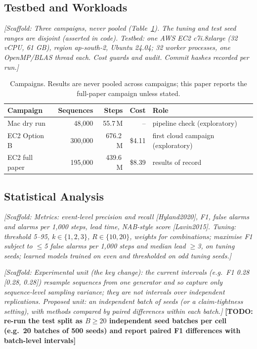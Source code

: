 \documentclass[conference]{IEEEtran}
\newcommand{\scaffold}[1]{\textcolor{blue!60!black}{\textit{[Scaffold: #1]}}}
\newcommand{\todo}[1]{\textcolor{red!70!black}{\textbf{[TODO: #1]}}}
\begin{document}
\subsection{Testbed and Workloads}\label{sec:testbed}
\scaffold{Three campaigns, never pooled (Table~\ref{tab:campaigns}). The tuning and test seed ranges are disjoint (asserted in code). Testbed: one AWS EC2 c7i.8xlarge (32 vCPU, 61 GB), region ap-south-2, Ubuntu 24.04; 32 worker processes, one OpenMP/BLAS thread each. Cost guards and audit. Commit hashes recorded per run.}

\begin{table}[t]
\centering\footnotesize
\caption{Campaigns. Results are never pooled across campaigns; this paper reports the full-paper campaign unless stated.}
\label{tab:campaigns}
\begin{tabular}{>{\raggedright\arraybackslash}p{1.7cm}rrr>{\raggedright\arraybackslash}p{1.6cm}}
\toprule
Campaign & Sequences & Steps & Cost & Role \\
\midrule
Mac dry run & 48,000 & 55.7\,M & -- & pipeline check (exploratory) \\
EC2 Option B & 300,000 & 676.2\,M & \$4.11 & first cloud campaign (exploratory) \\
EC2 full paper & 195,000 & 439.6\,M & \$8.39 & results of record \\
\bottomrule
\end{tabular}
\end{table}



\subsection{Statistical Analysis}\label{sec:stats}
\scaffold{Metrics: event-level precision and recall [Hyland2020], F1, false alarms and alarms per 1,000 steps, lead time, NAB-style score [Lavin2015]. Tuning: threshold 5--95, $k\in\{1,2,3\}$, $R\in\{10,20\}$, weights for combinations; maximise F1 subject to $\le$5 false alarms per 1,000 steps and median lead $\ge$3, on tuning seeds; learned models trained on even and thresholded on odd tuning seeds.}

\scaffold{Experimental unit (the key change): the current intervals (e.g.\ F1 0.28 [0.28, 0.28]) resample sequences from one generator and so capture only sequence-level sampling variance; they are not intervals over independent replications. Proposed unit: an independent batch of seeds (or a claim-tightness setting), with methods compared by paired differences within each batch.} \todo{re-run the test split as $B\ge20$ independent seed batches per cell (e.g.\ 20 batches of 500 seeds) and report paired F1 differences with batch-level intervals}
\end{document}
